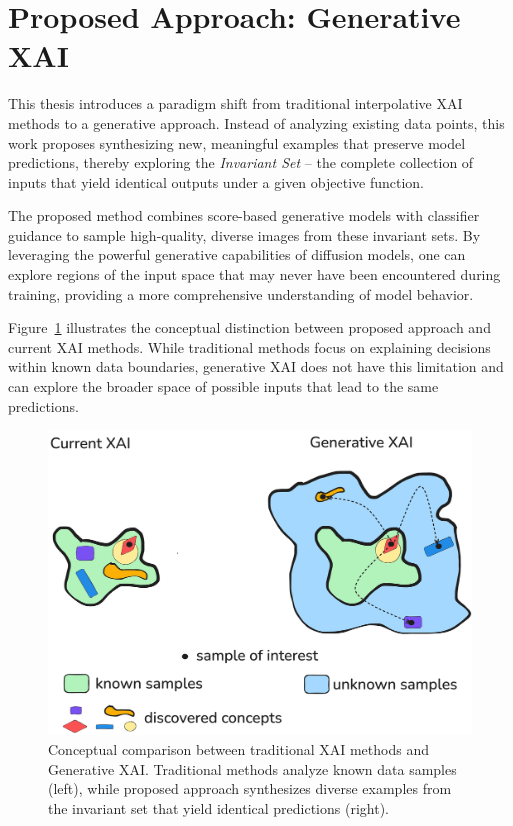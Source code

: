 \section{Proposed Approach: Generative XAI}

This thesis introduces a paradigm shift from traditional interpolative XAI methods to a generative approach. Instead of analyzing existing data points, this work proposes synthesizing new, meaningful examples that preserve model predictions, thereby exploring the \textit{Invariant Set} -- the complete collection of inputs that yield identical outputs under a given objective function.

The proposed method combines score-based generative models with classifier guidance to sample high-quality, diverse images from these invariant sets. By leveraging the powerful generative capabilities of diffusion models, one can explore regions of the input space that may never have been encountered during training, providing a more comprehensive understanding of model behavior.

Figure~\ref{fig:1_teaser} illustrates the conceptual distinction between proposed approach and current XAI methods. While traditional methods focus on explaining decisions within known data boundaries, generative XAI does not have this limitation and can explore the broader space of possible inputs that lead to the same predictions.

\begin{figure}[h]
\centering
\includegraphics[width=0.8\linewidth]{figures/main/teaser1.png}
\caption{Conceptual comparison between traditional XAI methods and Generative XAI. Traditional methods analyze known data samples (left), while proposed approach synthesizes diverse examples from the invariant set that yield identical predictions (right).}
\label{fig:1_teaser}
\end{figure}

